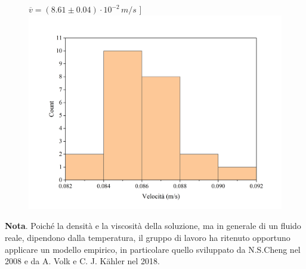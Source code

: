 \documentclass{article}
\begin{document}
\begin{center}
\begin{figure}[H]
      $\overline{v}=(8.61\pm0.04)\cdot10^{-2}\,\unit{m\per s}$
    ]{\includegraphics[trim={1cm 0.6cm 1cm 1cm},clip,width=.49\textwidth]{img/m2.png}}
    \hfil{}
    \hfil{}
  \end{figure}
\end{center}

\pagebreak
\textbf{Nota}.
Poiché la densità e la viscosità della soluzione,
ma in generale di un fluido reale, dipendono dalla temperatura,
il gruppo di lavoro ha ritenuto opportuno
applicare un modello empirico, in particolare quello sviluppato
da N.S.Cheng\cite{Cheng2008} nel 2008 e da A. Volk e C. J.
K\"ahler\cite{Volk2018} nel 2018.
\end{document}
